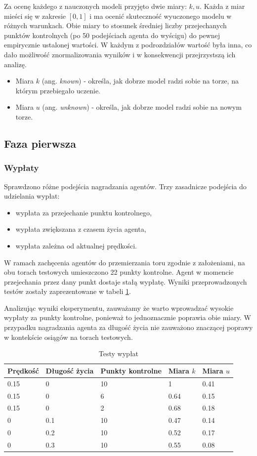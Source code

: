 \documentclass[a4paper,12pt]{article}
\begin{document}
Za ocenę każdego z nauczonych modeli przyjęto dwie miary: $k, u$. Każda z miar mieści się w zakresie $[0,1]$ i ma ocenić skuteczność wyuczonego modelu w różnych warunkach. Obie miary to stosunek średniej liczby przejechanych punktów kontrolnych (po 50 podejściach agenta do wyścigu) do pewnej empirycznie ustalonej wartości. W każdym z podrozdziałów wartość była inna, co dało możliwość znormalizowania wyników i w konsekwencji przejrzystszą ich analizę.
\begin{itemize}
	\item Miara $k$ (ang. \textit{known}) - określa, jak dobrze model radzi sobie na torze, na którym przebiegało uczenie.
	\item Miara $u$ (ang. \textit{unknown}) - określa, jak dobrze model radzi sobie na nowym torze. 
\end{itemize}


\subsection{Faza pierwsza}
\subsubsection{Wypłaty}
Sprawdzono różne podejścia nagradzania agentów. Trzy zasadnicze podejścia do udzielania wypłat:
\begin{itemize}
	\item wypłata za przejechanie punktu kontrolnego,
	\item wypłata zwiększana z czasem życia agenta,
	\item wypłata zależna od aktualnej prędkości.
\end{itemize}

W ramach zachęcenia agentów do przemierzania toru zgodnie z założeniami, na obu torach testowych umieszczono 22 punkty kontrolne. Agent w momencie przejechania przez dany punkt dostaje stałą wypłatę. Wyniki przeprowadzonych testów zostały zaprezentowane w tabeli \ref{tab:wyplaty}.

Analizując wyniki eksperymentu, zauważamy że warto wprowadzać wysokie wypłaty za punkty kontrolne, ponieważ to jednoznacznie poprawia obie miary. W przypadku nagradzania agenta za długość życia nie zauważono znaczącej poprawy w kontekście osiągów na torach testowych.

\begin{table}[H]
	\centering
	\smallskip
	\begin{tabular}{|l|l|l|l|l|}
		\hline
		Prędkość & Długość życia & Punkty kontrolne & Miara $k$ & Miara $u$ \\
		\hline
		0.15 & 0 & 10 & 1 & 0.41 \\
		0.15 & 0 & 6 & 0.64 & 0.15 \\
		0.15 & 0 & 2 & 0.68 & 0.18 \\ \hline
		0 & 0.1 & 10 & 0.47 & 0.14 \\
		0 & 0.2 & 10 & 0.52 & 0.17 \\
		0 & 0.3 & 10 & 0.55 & 0.08 \\ \hline
	\end{tabular}
	\caption{Testy wypłat}
	\label{tab:wyplaty}
\end{table}
\end{document}
